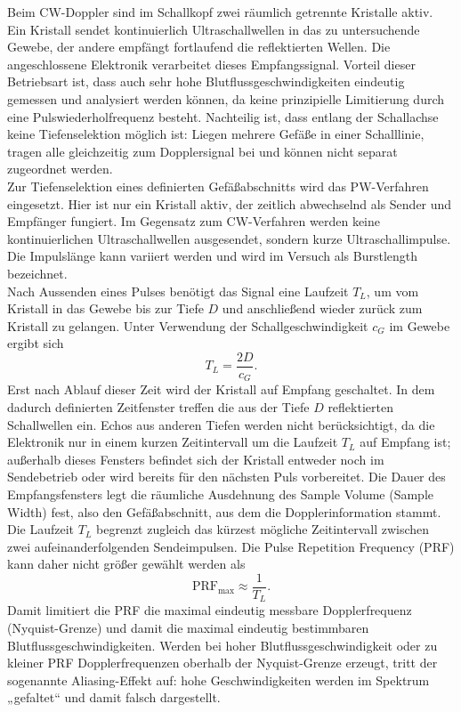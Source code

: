 \documentclass[
	german,%
	accentcolor=3d,%
	type=intern, %
	marginpar=false,%
]{tudapub}
\begin{document}
      Beim CW-Doppler sind im Schallkopf zwei räumlich getrennte Kristalle aktiv. Ein Kristall sendet kontinuierlich Ultraschallwellen in das zu untersuchende Gewebe, der andere empfängt fortlaufend die reflektierten Wellen. Die angeschlossene Elektronik verarbeitet dieses Empfangssignal. Vorteil dieser Betriebsart ist, dass auch sehr hohe Blutflussgeschwindigkeiten eindeutig gemessen und analysiert werden können, da keine prinzipielle Limitierung durch eine Pulswiederholfrequenz besteht. Nachteilig ist, dass entlang der Schallachse keine Tiefenselektion möglich ist: Liegen mehrere Gefäße in einer Schalllinie, tragen alle gleichzeitig zum Dopplersignal bei und können nicht separat zugeordnet werden.
      \\
      Zur Tiefenselektion eines definierten Gefäßabschnitts wird das PW-Verfahren eingesetzt. Hier ist nur ein Kristall aktiv, der zeitlich abwechselnd als Sender und Empfänger fungiert. Im Gegensatz zum CW-Verfahren werden keine kontinuierlichen Ultraschallwellen ausgesendet, sondern kurze Ultraschallimpulse. Die Impulslänge kann variiert werden und wird im Versuch
      als Burstlength bezeichnet.
      \\
      Nach Aussenden eines Pulses benötigt das Signal eine Laufzeit \(T_L\), um vom Kristall in das Gewebe bis zur Tiefe \(D\) und anschließend wieder zurück zum Kristall zu gelangen. Unter Verwendung der Schallgeschwindigkeit \(c_G\) im Gewebe ergibt sich
      \begin{equation}
         T_L = \frac{2D}{c_G}.
         \label{eq:laufzeit}
      \end{equation}
      Erst nach Ablauf dieser Zeit wird der Kristall auf Empfang geschaltet. In dem dadurch definierten Zeitfenster treffen die aus der Tiefe \(D\) reflektierten Schallwellen ein. Echos aus anderen Tiefen werden nicht berücksichtigt, da die Elektronik nur in einem kurzen Zeitintervall um die Laufzeit \(T_L\) auf Empfang ist; außerhalb dieses Fensters befindet sich der Kristall entweder noch im Sendebetrieb oder wird bereits für den nächsten Puls vorbereitet. Die Dauer des Empfangsfensters legt die räumliche Ausdehnung des Sample Volume (Sample Width) fest, also den Gefäßabschnitt, aus dem die Dopplerinformation
      stammt.
      \\
      Die Laufzeit \(T_L\) begrenzt zugleich das kürzest mögliche Zeitintervall zwischen zwei aufeinanderfolgenden Sendeimpulsen. Die Pulse Repetition Frequency (PRF) kann daher nicht größer gewählt werden als
      \begin{equation}
         \mathrm{PRF}_\text{max} \approx \frac{1}{T_L}.
         \label{eq:prf-max}
      \end{equation}
      Damit limitiert die PRF die maximal eindeutig messbare Dopplerfrequenz (Nyquist-Grenze) und damit die maximal eindeutig bestimmbaren Blutflussgeschwindigkeiten. Werden bei hoher Blutflussgeschwindigkeit oder zu kleiner PRF Dopplerfrequenzen oberhalb der Nyquist-Grenze erzeugt, tritt der sogenannte Aliasing-Effekt auf: hohe Geschwindigkeiten werden im Spektrum „gefaltet“ und damit falsch dargestellt.
\end{document}
